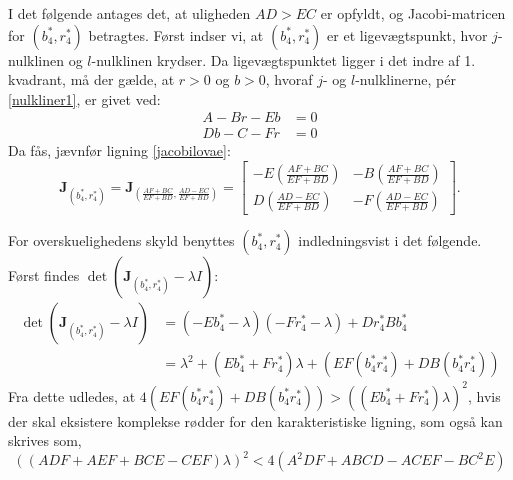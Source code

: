 
I det følgende antages det, at uligheden $AD > EC$ er opfyldt, og Jacobi-matricen for $(b^*_4,r^*_4)$ betragtes.
Først indser vi, at $(b^*_4,r^*_4)$ er et ligevægtspunkt, hvor $j$-nulklinen og $l$-nulklinen krydser. Da ligevægtspunktet ligger i det indre af 1. kvadrant, må der gælde, at $r > 0$ og $b > 0$, hvoraf $j$- og $l$-nulklinerne, pér \eqref{nulkliner1}, er givet ved:
\begin{align*}
    A - Br - Eb &=0\\
    Db -C -Fr &=0
\end{align*}
Da fås, jævnfør ligning \eqref{jacobilovae}:
 \begin{equation*}
    \textbf{J}_{(b_4^*, r_4^*)} = \textbf{J}_{(\frac{AF+BC}{EF+BD}, \frac{AD-EC}{EF+BD})} = \begin{bmatrix}
    -E\left( \frac{AF+BC}{EF+BD}\right) & -B\left( \frac{AF+BC}{EF+BD} \right) \\
    D \left(\frac{AD-EC}{EF+BD} \right) & -F \left( \frac{AD-EC}{EF+BD}\right)
        \end{bmatrix}.
\end{equation*}


For overskuelighedens skyld benyttes $(b_4^*,r_4^*)$ indledningsvist i det følgende. Først findes $\det(\textbf{J}_{(b_4^*,r_4^*)}-\lambda I)$:
\begin{align*}
   \det(\textbf{J}_{(b_4^*,r_4^*)}-\lambda I) &= \left( -Eb_4^* -\lambda \right) \left( -F r_4^*-\lambda\right)+ Dr_4^*Bb_4^* \\
   &=\lambda^2 + (Eb_4^* + F r_4^*)\lambda + (EF(b_4^*r_4^*) + DB(b_4^*r_4^*))
\end{align*}
Fra dette udledes, at $4(EF(b_4^*r_4^*) + DB(b_4^*r_4^*)) > ((Eb_4^* + F r_4^*)\lambda)^2$, hvis der skal eksistere komplekse rødder for den karakteristiske ligning, som også kan skrives som,
$$((ADF+AEF+BCE-CEF)\lambda)^2 < 4(A^2DF+ABCD-ACEF-BC^2E)$$






